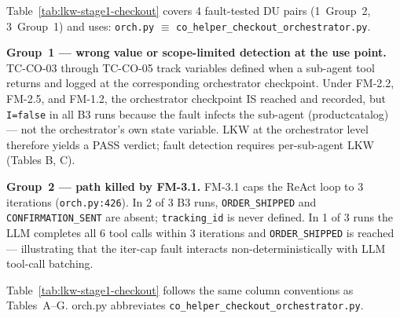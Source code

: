 \documentclass[sigconf,review,anonymous,balance=false]{acmart}
\begin{document}
Table~\ref{tab:lkw-stage1-checkout} covers 4 fault-tested DU pairs
(1~Group~2, 3~Group~1) and uses:
\texttt{orch.py} $\equiv$ \texttt{co\_helper\_checkout\_orchestrator.py}.

\textbf{Group~1 --- wrong value or scope-limited detection at the use point.}
TC-CO-03 through TC-CO-05 track variables defined when a sub-agent tool
returns and logged at the corresponding orchestrator checkpoint.
Under FM-2.2, FM-2.5, and FM-1.2, the orchestrator checkpoint IS reached and
recorded, but \texttt{I=false} in all B3 runs because the fault infects the
sub-agent (productcatalog) --- not the orchestrator's own state variable.
LKW at the orchestrator level therefore yields a PASS verdict; fault
detection requires per-sub-agent LKW (Tables B, C).

\textbf{Group~2 --- path killed by FM-3.1.}
FM-3.1 caps the ReAct loop to 3 iterations (\texttt{orch.py:426}).
In 2 of 3 B3 runs, \texttt{ORDER\_SHIPPED} and \texttt{CONFIRMATION\_SENT}
are absent; \texttt{tracking\_id} is never defined.
In 1 of 3 runs the LLM completes all 6 tool calls within 3 iterations and
\texttt{ORDER\_SHIPPED} is reached --- illustrating that the iter-cap fault
interacts non-deterministically with LLM tool-call batching.

Table~\ref{tab:lkw-stage1-checkout} follows the same column conventions as
Tables~A--G.
orch.py abbreviates \texttt{co\_helper\_checkout\_orchestrator.py}.
\end{document}
